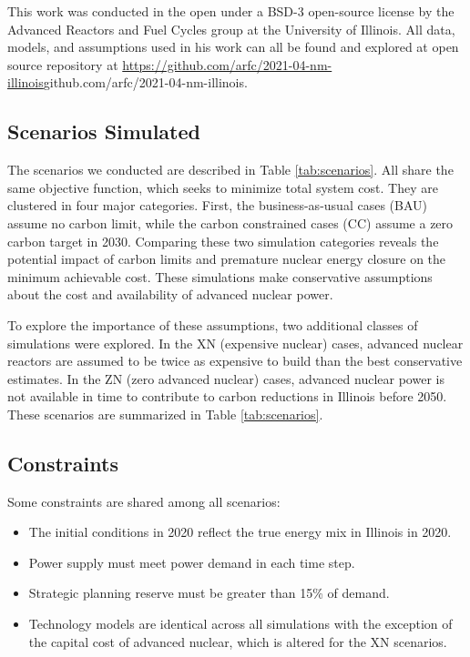 This work was conducted in the open under a BSD-3 open-source license by the 
Advanced Reactors and Fuel Cycles group at the University of Illinois. All 
data, models, and assumptions used in his work can all be found and explored at 
open source repository at 
\url{https://github.com/arfc/2021-04-nm-illinois}{github.com/arfc/2021-04-nm-illinois}.

\FloatBarrier
\subsection{Scenarios Simulated}\label{sec:simulations}

The scenarios we conducted are described in Table \ref{tab:scenarios}.
All share the same objective function, which seeks to minimize total system cost.
They are clustered in four major categories. First, the business-as-usual cases 
(BAU) assume no carbon limit, while the carbon constrained cases (CC) assume a zero 
carbon target in 2030. Comparing these two simulation categories reveals the 
potential impact of carbon limits and premature nuclear energy closure on 
the minimum achievable cost. These simulations make conservative assumptions 
about the cost and availability of advanced nuclear power. 

To explore the importance of these assumptions, two additional classes of 
simulations were explored. In the XN (expensive nuclear) cases, advanced 
nuclear reactors are assumed to be twice as expensive to build than the best 
conservative estimates. In the ZN (zero advanced nuclear) cases, advanced 
nuclear power is not available in time to contribute to carbon reductions in 
Illinois before 2050. These scenarios are summarized in Table 
\ref{tab:scenarios}. 






\FloatBarrier
\subsection{Constraints}
Some constraints are shared among all scenarios:
\begin{itemize}
        \item The initial conditions in 2020 reflect the true energy mix in Illinois in 2020.
        \item Power supply must meet power demand in each time step.
        \item Strategic planning reserve must be greater than 15\% of demand.
        \item Technology models are identical across all simulations with the exception of the capital cost of advanced nuclear, which is altered for the XN scenarios.  
\end{itemize}

